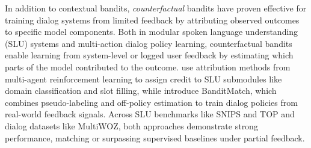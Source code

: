 \documentclass[11pt]{article}
\begin{document}
In addition to contextual bandits, \textit{counterfactual} bandits have proven effective for training dialog systems from limited feedback by attributing observed outcomes to specific model components. Both in modular spoken language understanding (SLU) systems and multi-action dialog policy learning, counterfactual bandits enable learning from system-level or logged user feedback by estimating which parts of the model contributed to the outcome. \citet{falke-lehnen-2021-feedback} use attribution methods from multi-agent reinforcement learning to assign credit to SLU submodules like domain classification and slot filling, while \citet{zhang2023multiactiondialogpolicylearning} introduce BanditMatch, which combines pseudo-labeling and off-policy estimation to train dialog policies from real-world feedback signals. Across SLU benchmarks like SNIPS and TOP and dialog datasets like MultiWOZ, both approaches demonstrate strong performance, matching or surpassing supervised baselines under partial feedback.



\end{document}
